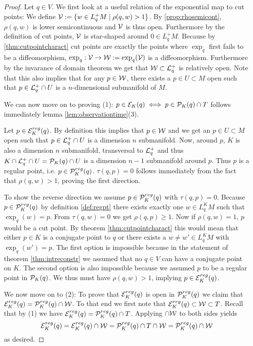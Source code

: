 \begin{proof}
Let $q\in V$. We first look at a useful relation of the exponential map to cut points: We define ${\mathcal{V}}:=\{w\in L^+_qM \mid \rho(q,w)>1\}$. By \ref{prop:rhosemicont}, $\rho(q,w)$ is lower semicontinuous and ${\mathcal{V}}$ is thus open. Furthermore by the definition of cut points, ${\mathcal{V}}$ is star-shaped around $0\in L^+_qM$. Because by \ref{thm:cutpointcharact} cut points are exactly the points where $\exp_q$ first fails to be a diffeomorphism, $\exp_q:{\mathcal{V}}\to {\mathcal{W}}:=\exp_q({\mathcal{V}})$ is a diffeomorphism. Furthermore by the invarance of domain theorem we get that ${\mathcal{W}}\subset {\mathcal{L}}^+_q$ is relatively open. Note that this also implies that for any $p\in {\mathcal{W}}$, there exists a $p\in U\subset M$ open such that $p\in{\mathcal{L}}^+_q\cap U$ is a $n$-dimensional submanifold of $M$.

We can now move on to proving (1): $p\in {\mathcal{E}}_K(q) \iff p\in {\mathcal{P}}_K(q) \cap T$ follows immediately lemma \ref{lem:observationtime}(3).

Let $p\in{\mathcal{E}}^{reg}_K(q)$. By definition this implies that $p\in {\mathcal{W}}$ and we get an $p\in U\subset M$ open such that $p\in{\mathcal{L}}^+_q\cap U$ is a dimension $n$ submanifold. Now, around $p$, $K$ is also a dimension $n$ submanifold, transversal to ${\mathcal{L}}^+_q$ and thus $K \cap {\mathcal{L}}^+_q \cap U = {{\mathcal{P}}_K(q)} \cap U$ is a dimension $n-1$ submanifold around $p$. Thus $p$ is a regular point, i.e. $p\in {\mathcal{P}}^{reg}_K(q)$. $\tau(q,p)=0$ follows immediately from the fact that $\rho(q,w)>1$, proving the first direction.

To show the reverse direction we assume $p\in {\mathcal{P}}^{reg}_K(q)$ with $\tau(q,p)=0$.
Because $p\in {\mathcal{P}}^{reg}_K(q)$ by definition \ref{def:regpt} there exists exactly one $w\in L^K_qM$ such that $\exp_q(w)=p$. From $\tau(q,w)=0$ we get $\rho(q,p)\ge 1$. Now if $\rho(q,w)=1$, $p$ would be a cut point. By theorem \ref{thm:cutpointcharact} this would mean that either $p\in K$ is a conjugate point to $q$ or there exists a $w\neq w'\in L^K_qM$ with $\exp_q(w')=p$. The first option is impossible because in the statement of theorem \ref{thm:intreconstr} we assumed that no $q\in V$ can have a conjugate point on $K$. The second option is also impossible because we assumed $p$ to be a regular point in ${\mathcal{P}}_K(q)$. We thus must have $\rho(q,w)>1$, implying $p\in {\mathcal{E}}^{reg}_K(q)$.

We now move on to (2): To prove that ${\mathcal{E}}^{reg}_K(q)$ is open in ${\mathcal{P}}^{reg}_K(q)$ we claim that ${\mathcal{E}}^{reg}_K(q)={\mathcal{P}}^{reg}_K(q)\cap {\mathcal{W}}$. To that end we first note that ${\mathcal{E}}_K^{reg}(q)\subset {\mathcal{W}} \subset T$. Recall that by (1) we have ${\mathcal{E}}_K^{reg}(q) = {\mathcal{P}}_K^{reg}(q) \cap T$. Applying $\cap {\mathcal{W}}$ to both sides yields
\[
    {\mathcal{E}}_K^{reg}(q) = {\mathcal{E}}_K^{reg}(q) \cap {\mathcal{W}} = {\mathcal{P}}_K^{reg}(q) \cap T \cap {\mathcal{W}} = {\mathcal{P}}_K^{reg}(q) \cap {\mathcal{W}}
\] as desired.


\end{proof}
